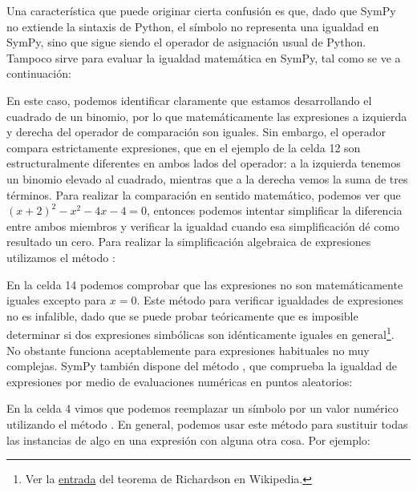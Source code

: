 
Una característica que puede originar cierta confusión es que, dado que SymPy no extiende la sintaxis de Python, el símbolo \mip{=} no representa una igualdad en SymPy, sino que sigue siendo el operador de asignación usual de Python. Tampoco \mip{==} sirve para evaluar la igualdad matemática en SymPy, tal como se ve a continuación:


En este caso, podemos identificar claramente que estamos desarrollando el cuadrado de un binomio, por lo que matemáticamente las expresiones a izquierda y derecha del operador de comparación son iguales. Sin embargo, el operador \mip{==} compara estrictamente expresiones, que en el ejemplo de la celda 12 son estructuralmente diferentes en ambos lados del operador: a la izquierda tenemos un binomio elevado al cuadrado, mientras que a la derecha vemos la suma de tres términos. Para realizar la comparación en sentido matemático, podemos ver que $(x + 2)^2 - x^2 -4 x -4 =0$, entonces podemos intentar simplificar la diferencia entre ambos miembros y verificar la igualdad cuando esa simplificación dé como resultado un cero. Para realizar la simplificación algebraica de expresiones utilizamos el método :


En la celda 14 podemos comprobar que las expresiones no son matemáticamente iguales excepto para $x = 0$. Este método para verificar igualdades de expresiones no es infalible, dado que se puede probar teóricamente que es imposible determinar si dos expresiones simbólicas son idénticamente iguales en general\footnote{Ver la \href{https://en.wikipedia.org/wiki/Richardson's\_theorem}{entrada} del teorema de Richardson en Wikipedia.}. No obstante funciona aceptablemente para expresiones habituales no muy complejas. SymPy también dispone del método , que comprueba la igualdad de expresiones por medio de evaluaciones numéricas en puntos aleatorios:


En la celda 4 vimos que podemos reemplazar un símbolo por un valor numérico utilizando el método . En general, podemos usar este método para sustituir todas las instancias de algo en una expresión con alguna otra cosa. Por ejemplo:

